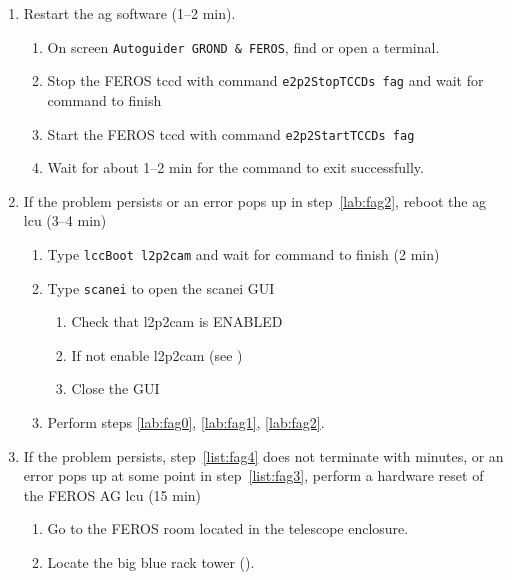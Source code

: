 \documentclass[11pt,fleqn,a4paper]{book}
\begin{document}
\label{proc:restartfag}
\begin{enumerate}
    \item Restart the \gls{ag} software (1--2 min).
        \begin{enumerate}
            \item\label{lab:fag0} On screen \texttt{Autoguider GROND \& FEROS}, find or open a terminal.
            \item Stop the FEROS \acrlong{tccd} with command
                  \texttt{\gls{e2p2StopTCCDs} fag} and wait for command to finish
            \item\label{lab:fag1} Start the FEROS \acrlong{tccd} with command
                  \texttt{\gls{e2p2StartTCCDs} fag} 
            \item\label{lab:fag2} Wait for about 1--2 min for the command to exit successfully.
        \end{enumerate}
    \item\label{list:fag3} If the problem persists or an error pops up in step~\ref{lab:fag2}, reboot the \gls{ag} \gls{lcu} (3--4 min) 
        \begin{enumerate}
            \item\label{list:fag4} Type \texttt{\gls{lccBoot} \gls{l2p2cam}} and wait for command to finish (2 min)
            \item Type \texttt{scanei} to open the scanei GUI
            \begin{enumerate}
                \item Check that l2p2cam is ENABLED
                \item If not enable l2p2cam (see )
                \item Close the GUI
            \end{enumerate}
            \item Perform steps \ref{lab:fag0}, \ref{lab:fag1}, \ref{lab:fag2}.
        \end{enumerate}
    \item If the problem persists, step~\ref{list:fag4} does not terminate with minutes, or an error pops up at some point in step~\ref{list:fag3}, perform a hardware reset of the FEROS AG \gls{lcu} (15 min)
    \begin{enumerate}
       \item Go to the FEROS room located in the telescope enclosure. 
       \item Locate the big blue rack tower ().

\end{enumerate}
\end{enumerate}
\end{document}
